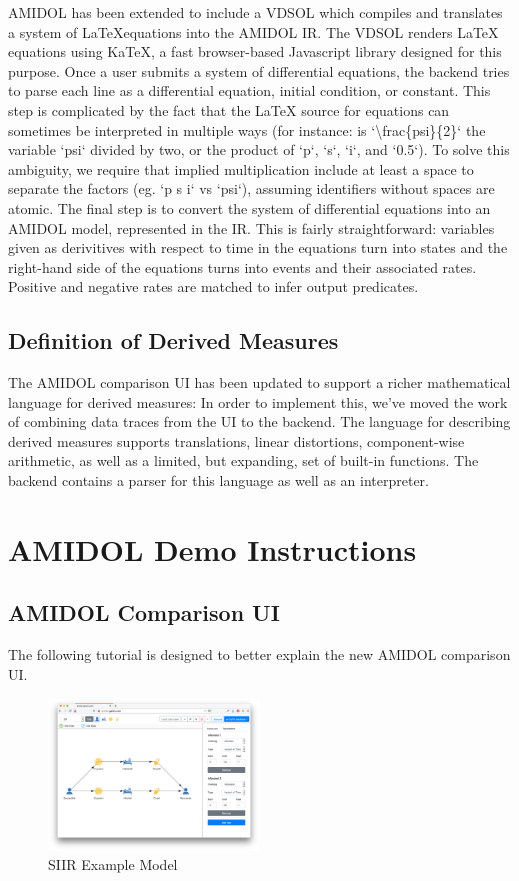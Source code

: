 \documentclass[12pt]{galois-whitepaper}
\begin{document}
AMIDOL has been extended to include a VDSOL which compiles and
translates a system of \LaTeX equations into the AMIDOL IR. The VDSOL renders LaTeX
equations using KaTeX, a fast browser-based Javascript library
designed for this purpose. Once a user submits a system of
differential equations, the backend tries to parse each line as a
differential equation, initial condition, or constant. This step is
complicated by the fact that the LaTeX source for equations can
sometimes be interpreted in multiple ways (for instance: is
`\textbackslash frac\{psi\}\{2\}` the variable `psi` divided by two, or
the product of `p`, `s`, `i`, and `0.5`). To solve this ambiguity, we
require that implied multiplication include at least a space to
separate the factors (eg. `p s i` vs `psi`), assuming identifiers
without spaces are atomic. The final step is to
convert the system of differential equations into an AMIDOL
model, represented in the IR. This is fairly straightforward:
variables given as derivitives with respect to time in the equations turn
into states and the right-hand side of the equations turns into
events and their associated rates.  Positive and negative rates are
matched to infer output predicates.

\subsection{Definition of Derived Measures}

The AMIDOL comparison UI has been updated
to support a richer mathematical language
for derived measures:  In order to implement this, we’ve moved the
work of combining data traces from the UI to the backend. The language
for describing derived measures supports translations, linear
distortions, component-wise arithmetic, as well as a limited, but
expanding, set of built-in functions. The backend contains a parser for this language as
well as an interpreter.

\section{AMIDOL Demo Instructions}

\subsection{AMIDOL Comparison UI}

The following tutorial is designed to better explain the new AMIDOL
comparison UI.

\begin{figure}
  \centering
  \includegraphics[width=0.5\textwidth]{figs/comparision-ui-1.png}
  \caption{SIIR Example Model}
  \label{Fig:Comparison1}
\end{figure}
\end{document}
